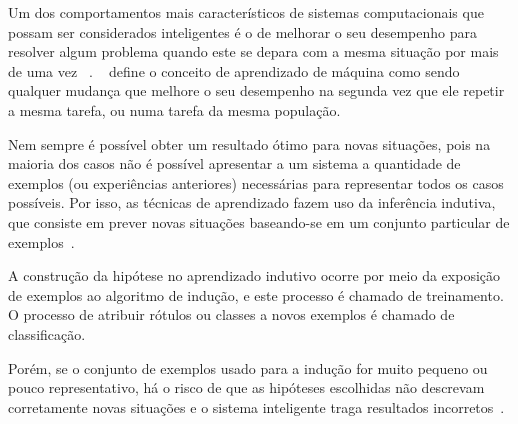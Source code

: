 % 
%

\newcommand{\vect}[1]{\mathbf{#1}}
\newcommand{\norma}[1]{\lVert #1 \rVert}

%
%
%

Um dos comportamentos mais característicos de sistemas computacionais que possam ser considerados inteligentes é o de melhorar o seu desempenho para resolver algum problema quando este se depara com a mesma situação por mais de uma vez ~\cite{luger2004inteligencia}. ~ define o conceito de aprendizado de máquina como sendo qualquer mudança que melhore o seu desempenho na segunda vez que ele repetir a mesma tarefa, ou numa tarefa da mesma população.

Nem sempre é possível obter um resultado ótimo para novas situações, pois na maioria dos casos não é possível apresentar a um sistema a quantidade de exemplos (ou experiências anteriores) necessárias para representar todos os casos possíveis. Por isso, as técnicas de aprendizado fazem uso da inferência indutiva, que consiste em prever novas situações baseando-se em um conjunto particular de exemplos~\cite{luger2004inteligencia}.

A construção da hipótese no aprendizado indutivo ocorre por meio da exposição de exemplos ao algoritmo de indução, e este processo é chamado de treinamento. O processo de atribuir rótulos ou classes a novos exemplos é chamado de classificação.

Porém, se o conjunto de exemplos usado para a indução for muito pequeno ou pouco representativo, há o risco de que as hipóteses escolhidas não descrevam corretamente novas situações e o sistema inteligente traga resultados incorretos~\cite[p. 90]{rezende2003sistemas}.

